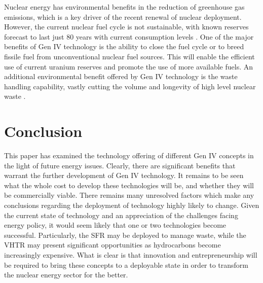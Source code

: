 \documentclass[journal]{IEEEtran}
\begin{document}
Nuclear energy has environmental benefits in the reduction of greenhouse gas emissions, which is a key driver of the recent renewal of nuclear deployment.
However, the current nuclear fuel cycle is not sustainable, with known reserves forecast to last just 80 years with current consumption levels \cite{Marques2010a}.
One of the major benefits of Gen IV technology is the ability to close the fuel cycle or to breed fissile fuel from unconventional nuclear fuel sources.
This will enable the efficient use of current uranium reserves and promote the use of more available fuels.
An additional environmental benefit offered by Gen IV technology is the waste handling capability, vastly cutting the volume and longevity of high level nuclear waste \cite{GenIVRoadmap}.






\section{Conclusion}

This paper has examined the technology offering of different Gen IV concepts in the light of future energy issues.
Clearly, there are significant benefits that warrant the further development of Gen IV technology.
It remains to be seen what the whole cost to develop these technologies will be, and whether they will be commercially viable.
There remains many unresolved factors which make any conclusions regarding the deployment of technology highly likely to change.
Given the current state of technology and an appreciation of the challenges facing energy policy, it would seem likely that one or two technologies become successful. Particularly, the SFR may be deployed to manage waste, while the VHTR may present significant opportunities as hydrocarbons become increasingly expensive.
What is clear is that innovation and entrepreneurship will be required to bring these concepts to a deployable state in order to transform the nuclear energy sector for the better.




\clearpage
\appendices
\end{document}
